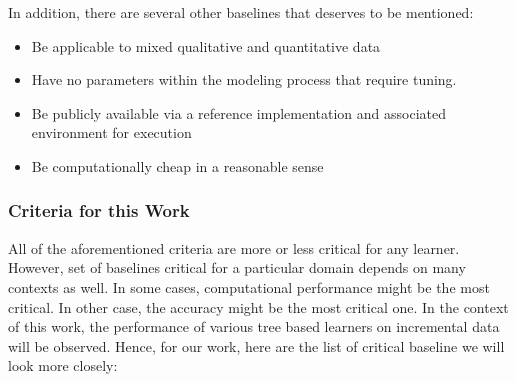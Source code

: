 \documentclass[sigplan]{acmart}\settopmatter{printfolios=true,printccs=false,printacmref=false}
\begin{document}
In addition, there are several other baselines that deserves to be mentioned:
\begin{itemize}
	\item Be applicable to mixed qualitative and quantitative data
	\item Have no parameters within the modeling process that require tuning.
	\item Be publicly available via a reference implementation and associated environment for execution
	\item Be computationally cheap in a reasonable sense
\end{itemize}

\subsubsection{Criteria for this Work}
All of the aforementioned criteria are more or less critical for any learner. However, set of baselines critical for a particular domain depends on many contexts as well. In some cases, computational performance might be the most critical. In other case, the accuracy might be the most critical one. In the context of this work, the performance of various tree based learners on incremental data will be observed. Hence, for our work, here are the list of critical baseline we will look more closely:
\end{document}

